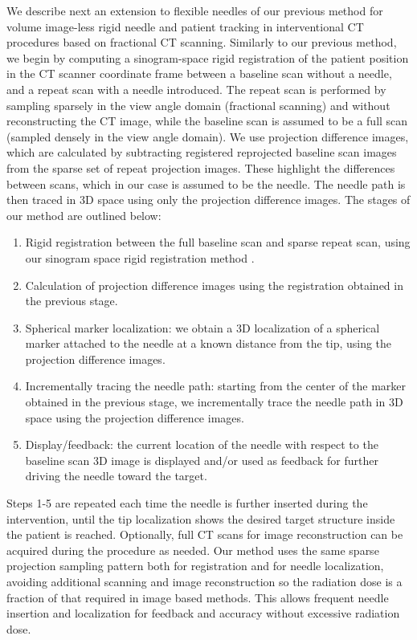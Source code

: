 \documentclass[letterpaper, 10 pt, conference]{ieeeconf}  %
\begin{document}
We describe next an extension to flexible needles of our previous method \cite{medan2017reduced} for volume image-less rigid needle and patient tracking in interventional CT procedures based on fractional CT scanning. Similarly to our previous method, we begin by computing a sinogram-space rigid registration of the patient position in the CT scanner coordinate frame between a baseline scan without a needle, and a repeat scan with a needle introduced. The repeat scan is performed by sampling sparsely in the view angle domain (fractional scanning) and without reconstructing the CT image, while the baseline scan is assumed to be a full scan (sampled densely in the view angle domain). We use projection difference images, which are calculated by subtracting registered reprojected baseline scan images from the sparse set of repeat projection images. These highlight the differences between scans, which in our case is assumed to be the needle. The needle path is then traced in 3D space using only the projection difference images. The stages of our method are outlined below:
\begin{enumerate}
\item Rigid registration between the full baseline scan and sparse repeat scan, using our sinogram space rigid registration method \cite{medan2017sparse}.
\item Calculation of projection difference images using the registration obtained in the previous stage.
\item Spherical marker localization: we obtain a 3D localization of a spherical marker attached to the needle at a known distance from the tip, using the projection difference images.
\item Incrementally tracing the needle path: starting from the center of the marker obtained in the previous stage, we incrementally trace the needle path in 3D space using the projection difference images.
\item Display/feedback: the current location of the needle with respect to the baseline scan 3D image is displayed and/or used as feedback for further driving the needle toward the target.
\end{enumerate}
Steps 1-5 are repeated each time the needle is further inserted during the intervention, until the tip localization shows the desired target structure inside the patient is reached. Optionally, full CT scans for image reconstruction can be acquired during the procedure as needed. Our method uses the same sparse projection sampling pattern both for registration and for needle localization, avoiding additional scanning and image reconstruction so the radiation dose is a fraction of that required in image based methods. This allows frequent needle insertion and localization for feedback and accuracy without excessive radiation dose.
\end{document}
